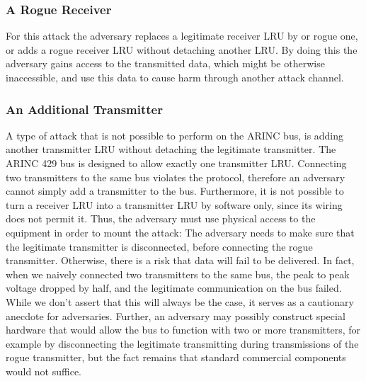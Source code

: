 \documentclass[conference]{IEEEtran}
\begin{document}

\subsubsection{A Rogue Receiver}
  For this attack the adversary replaces a legitimate receiver LRU by or rogue one, or adds a rogue receiver LRU without detaching another LRU. By doing this the adversary gains access to the transmitted data, which might be otherwise inaccessible, and use this data to cause harm through another attack channel.

\subsubsection{An Additional Transmitter}
  A type of attack that is not possible to perform on the ARINC bus, is adding another transmitter LRU without detaching the legitimate transmitter. The ARINC 429 bus is designed to allow exactly one transmitter LRU. Connecting two transmitters to the same bus violates the protocol, therefore an adversary cannot simply add a transmitter to the bus. Furthermore, it is not possible to turn a receiver LRU into a transmitter LRU by software only, since its wiring does not permit it. Thus, the adversary must use physical access to the equipment in order to mount the attack: The adversary needs to make sure that the legitimate transmitter is disconnected, before connecting the rogue transmitter. Otherwise, there is a risk that data will fail to be delivered. In fact, when we naively connected two transmitters to the same bus, the peak to peak voltage dropped by half, and the legitimate communication on the bus failed. While we don't assert that this will always be the case, it serves as a cautionary anecdote for adversaries. Further, an adversary may possibly construct special hardware that would allow the bus to function with two or more transmitters, for example by disconnecting the legitimate transmitting during transmissions of the rogue transmitter, but the fact remains that standard commercial components would not suffice.
\end{document}
